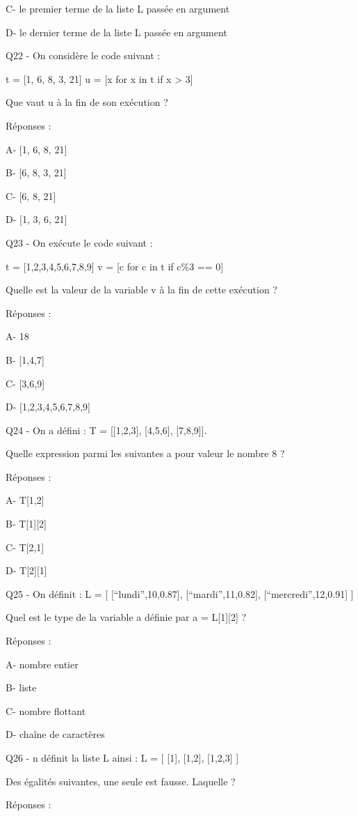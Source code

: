 \documentclass[
]{book}
\begin{document}
C- le premier terme de la liste L passée en argument

D- le dernier terme de la liste L passée en argument

Q22 - On considère le code suivant :

t = {[}1, 6, 8, 3, 21{]}
u = {[}x for x in t if x \textgreater{} 3{]}

Que vaut u à la fin de son exécution ?

Réponses :

A- {[}1, 6, 8, 21{]}

B- {[}6, 8, 3, 21{]}

C- {[}6, 8, 21{]}

D- {[}1, 3, 6, 21{]}

Q23 - On exécute le code suivant :

t = {[}1,2,3,4,5,6,7,8,9{]}
v = {[}c for c in t if c\%3 == 0{]}

Quelle est la valeur de la variable v à la fin de cette exécution ?

Réponses :

A- 18

B- {[}1,4,7{]}

C- {[}3,6,9{]}

D- {[}1,2,3,4,5,6,7,8,9{]}

Q24 - On a défini : T = {[}{[}1,2,3{]}, {[}4,5,6{]}, {[}7,8,9{]}{]}.

Quelle expression parmi les suivantes a pour valeur le nombre 8 ?

Réponses :

A- T{[}1,2{]}

B- T{[}1{]}{[}2{]}

C- T{[}2,1{]}

D- T{[}2{]}{[}1{]}

Q25 - On définit :
L = {[} {[}``lundi'',10,0.87{]}, {[}``mardi'',11,0.82{]}, {[}``mercredi'',12,0.91{]} {]}

Quel est le type de la variable a définie par a = L{[}1{]}{[}2{]} ?

Réponses :

A- nombre entier

B- liste

C- nombre flottant

D- chaîne de caractères

Q26 - n définit la liste L ainsi : L = {[} {[}1{]}, {[}1,2{]}, {[}1,2,3{]} {]}

Des égalités suivantes, une seule est fausse. Laquelle ?

Réponses :
\end{document}
